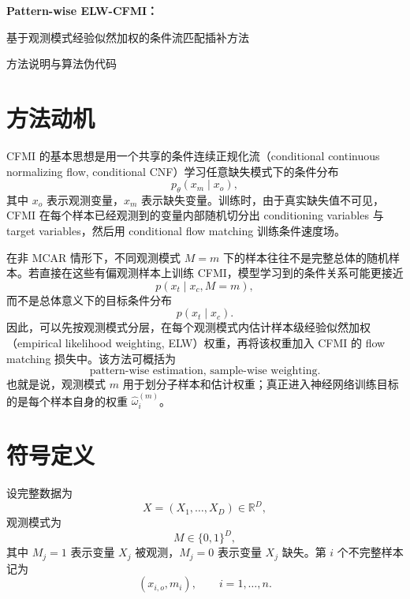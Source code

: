 \documentclass[12pt,a4paper]{article}
\newcommand{\R}{\mathbb{R}}
\newcommand{\what}{\widehat}
\begin{document}
\begin{center}
    {\Large\bfseries Pattern-wise ELW-CFMI：}\par\vspace{0.35em}
    {\Large 基于观测模式经验似然加权的条件流匹配插补方法}\par\vspace{1.2em}
    {\normalsize 方法说明与算法伪代码}\par
\end{center}

\vspace{1.2em}

\section{方法动机}

CFMI 的基本思想是用一个共享的条件连续正规化流（conditional continuous normalizing flow, conditional CNF）学习任意缺失模式下的条件分布
\begin{equation}
    p_{\theta}(x_m\mid x_o),
\end{equation}
其中 $x_o$ 表示观测变量，$x_m$ 表示缺失变量。训练时，由于真实缺失值不可见，CFMI 在每个样本已经观测到的变量内部随机切分出 conditioning variables 与 target variables，然后用 conditional flow matching 训练条件速度场。

在非 MCAR 情形下，不同观测模式 $M=m$ 下的样本往往不是完整总体的随机样本。若直接在这些有偏观测样本上训练 CFMI，模型学习到的条件关系可能更接近
\begin{equation}
    p(x_t\mid x_c,M=m),
\end{equation}
而不是总体意义下的目标条件分布
\begin{equation}
    p(x_t\mid x_c).
\end{equation}
因此，可以先按观测模式分层，在每个观测模式内估计样本级经验似然加权（empirical likelihood weighting, ELW）权重，再将该权重加入 CFMI 的 flow matching 损失中。该方法可概括为
\begin{equation}
    \boxed{\text{pattern-wise estimation, sample-wise weighting}.}
\end{equation}
也就是说，观测模式 $m$ 用于划分子样本和估计权重；真正进入神经网络训练目标的是每个样本自身的权重 $\what{\omega}^{(m)}_i$。

\section{符号定义}

设完整数据为
\begin{equation}
    X=(X_1,\ldots,X_D)\in\R^D,
\end{equation}
观测模式为
\begin{equation}
    M\in\{0,1\}^D,
\end{equation}
其中 $M_j=1$ 表示变量 $X_j$ 被观测，$M_j=0$ 表示变量 $X_j$ 缺失。第 $i$ 个不完整样本记为
\begin{equation}
    (x_{i,o},m_i),\qquad i=1,\ldots,n.
\end{equation}
\end{document}
